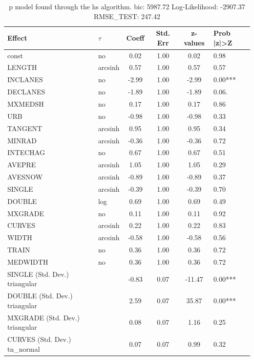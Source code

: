 \begin{table}
	\caption{p model found through the hs algorithm. bic: 5987.72 Log-Likelihood: -2907.37 RMSE_TEST: 247.42}
	\begin{center}
		\begin{tabular}{|l|l|c|c|c|l|}
			\hline
			Effect & $\tau$ & Coeff & Std. Err & z-values & Prob |z|>Z \\
			\hline
			const & no & 0.02 & 1.00 & 0.02 & 0.98 \\
			\hline
			LENGTH & arcsinh & 0.57 & 1.00 & 0.57 & 0.57 \\
			\hline
			INCLANES & no & -2.99 & 1.00 & -2.99 & 0.00*** \\
			\hline
			DECLANES & no & -1.89 & 1.00 & -1.89 & 0.06. \\
			\hline
			MXMEDSH & no & 0.17 & 1.00 & 0.17 & 0.86 \\
			\hline
			URB & no & -0.98 & 1.00 & -0.98 & 0.33 \\
			\hline
			TANGENT & arcsinh & 0.95 & 1.00 & 0.95 & 0.34 \\
			\hline
			MINRAD & arcsinh & -0.36 & 1.00 & -0.36 & 0.72 \\
			\hline
			INTECHAG & no & 0.67 & 1.00 & 0.67 & 0.51 \\
			\hline
			AVEPRE & arcsinh & 1.05 & 1.00 & 1.05 & 0.29 \\
			\hline
			AVESNOW & arcsinh & -0.89 & 1.00 & -0.89 & 0.37 \\
			\hline
			SINGLE & arcsinh & -0.39 & 1.00 & -0.39 & 0.70 \\
			\hline
			DOUBLE & log & 0.69 & 1.00 & 0.69 & 0.49 \\
			\hline
			MXGRADE & no & 0.11 & 1.00 & 0.11 & 0.92 \\
			\hline
			CURVES & arcsinh & 0.22 & 1.00 & 0.22 & 0.83 \\
			\hline
			WIDTH & arcsinh & -0.58 & 1.00 & -0.58 & 0.56 \\
			\hline
			TRAIN & no & 0.36 & 1.00 & 0.36 & 0.72 \\
			\hline
			MEDWIDTH & no & 0.36 & 1.00 & 0.36 & 0.72 \\
			\hline
			SINGLE (Std. Dev.) triangular &  & -0.83 & 0.07 & -11.47 & 0.00*** \\
			\hline
			DOUBLE (Std. Dev.) triangular &  & 2.59 & 0.07 & 35.87 & 0.00*** \\
			\hline
			MXGRADE (Std. Dev.) triangular &  & 0.08 & 0.07 & 1.16 & 0.25 \\
			\hline
			CURVES (Std. Dev.) tn_normal &  & 0.07 & 0.07 & 0.99 & 0.32 \\

\end{tabular}
\end{center}
\end{table}
